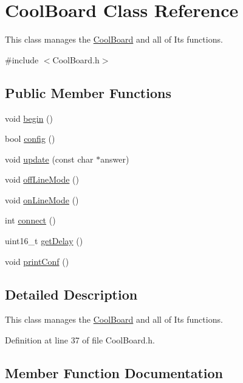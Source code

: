 \hypertarget{class_cool_board}{}\section{Cool\+Board Class Reference}
\label{class_cool_board}


This class manages the \hyperlink{class_cool_board}{Cool\+Board} and all of Its functions.  




{\ttfamily \#include $<$Cool\+Board.\+h$>$}

\subsection*{Public Member Functions}
\begin{DoxyCompactItemize}
\item 
void \hyperlink{class_cool_board_acba7c5aef7268b2c0044bdb54d3b9d76}{begin} ()
\item 
bool \hyperlink{class_cool_board_a583a874c09c07e70a6eb9229fc4beddb}{config} ()
\item 
void \hyperlink{class_cool_board_a8612756d3f73198cdde857a66f0fe690}{update} (const char $\ast$answer)
\item 
void \hyperlink{class_cool_board_ae6b5e1274d760462290192acea4adca8}{off\+Line\+Mode} ()
\item 
void \hyperlink{class_cool_board_aa0bbc4bc605e35618d18e68795c61363}{on\+Line\+Mode} ()
\item 
int \hyperlink{class_cool_board_a519de78b807f8ec6463ff484eb925918}{connect} ()
\item 
uint16\+\_\+t \hyperlink{class_cool_board_a12c3b5fa0ee6cc2c7d397abfc78f0f43}{get\+Delay} ()
\item 
void \hyperlink{class_cool_board_a486507b8f0981d3cc671ed31c2145755}{print\+Conf} ()
\end{DoxyCompactItemize}


\subsection{Detailed Description}
This class manages the \hyperlink{class_cool_board}{Cool\+Board} and all of Its functions. 

Definition at line 37 of file Cool\+Board.\+h.



\subsection{Member Function Documentation}
\mbox{\label{class_cool_board_acba7c5aef7268b2c0044bdb54d3b9d76}} 

